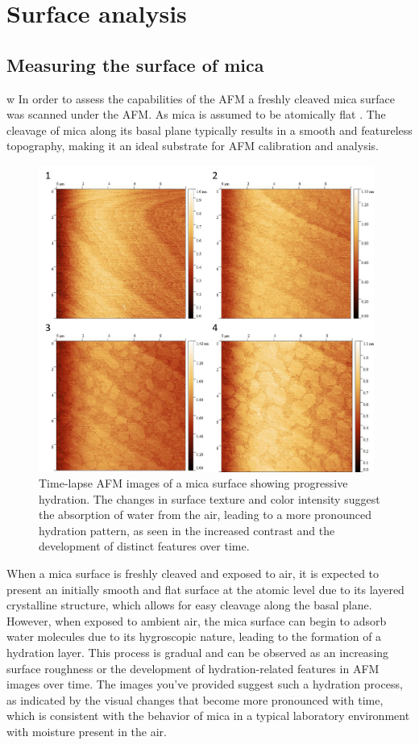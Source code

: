 \section{Surface analysis}

\subsection{Measuring the surface of mica}
w
In order to assess the capabilities of the AFM a freshly cleaved mica surface was scanned under the AFM. As mica is assumed to be atomically flat \cite{MicaSurf, Ostendorf_2008}. The cleavage of mica along its basal plane typically results in a smooth and featureless topography, making it an ideal substrate for AFM calibration and analysis.

\begin{figure}[h!!!!!!!]     %
        \begin{center}
          \includegraphics[width=110mm]{chapter3/Mica hydration.png}
\end{center}
\caption{Time-lapse AFM images of a mica surface showing progressive hydration. The changes in surface texture and color intensity suggest the absorption of water from the air, leading to a more pronounced hydration pattern, as seen in the increased contrast and the development of distinct features over time.}
\label{fig:ImageAFM}                 %
\end{figure}

When a mica surface is freshly cleaved and exposed to air, it is expected to present an initially smooth and flat surface at the atomic level due to its layered crystalline structure, which allows for easy cleavage along the basal plane. However, when exposed to ambient air, the mica surface can begin to adsorb water molecules due to its hygroscopic nature, leading to the formation of a hydration layer. This process is gradual and can be observed as an increasing surface roughness or the development of hydration-related features in AFM images over time. The images you've provided suggest such a hydration process, as indicated by the visual changes that become more pronounced with time, which is consistent with the behavior of mica in a typical laboratory environment with moisture present in the air. \cite{MicaSurf}

